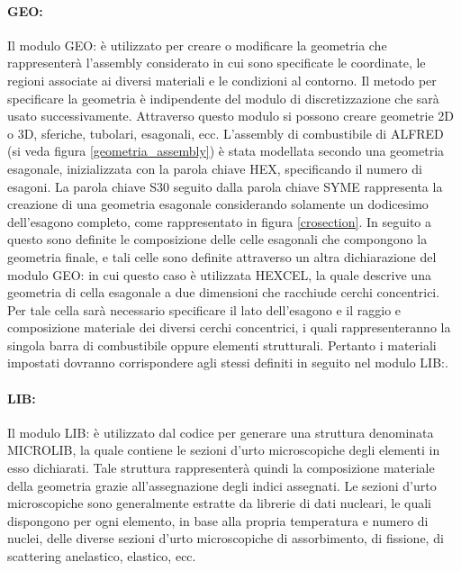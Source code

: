 \paragraph{GEO:}

Il modulo GEO: è utilizzato per creare o modificare la geometria che 
rappresenterà l'assembly considerato in cui sono specificate le coordinate, le 
regioni associate ai diversi materiali e le condizioni al contorno.
Il metodo per specificare la geometria è indipendente del modulo di 
discretizzazione che sarà usato successivamente.
Attraverso questo modulo si possono creare geometrie 2D o 3D, sferiche, 
tubolari, esagonali, ecc.
L'assembly di combustibile di ALFRED (si veda figura \ref{geometria_assembly}) 
è 
stata modellata secondo una geometria esagonale, inizializzata con la parola 
chiave HEX, specificando il numero di esagoni.
La parola chiave S30 seguito dalla parola chiave SYME rappresenta la creazione 
di una geometria esagonale considerando solamente un dodicesimo dell'esagono completo, 
come rappresentato in figura \ref{crosection}.
In seguito a questo sono definite le composizione delle celle esagonali che 
compongono la geometria finale, e tali celle sono definite attraverso un altra 
dichiarazione del modulo GEO: in cui questo caso è utilizzata HEXCEL, la quale descrive 
una geometria di cella esagonale a due dimensioni che racchiude cerchi 
concentrici. Per tale cella sarà necessario specificare il lato dell'esagono e 
il raggio e composizione materiale dei diversi cerchi concentrici, i quali 
rappresenteranno la singola barra di combustibile oppure elementi strutturali.
Pertanto i materiali impostati dovranno corrispondere agli stessi definiti in 
seguito nel modulo LIB:.

\paragraph{LIB:}
Il modulo LIB: è utilizzato dal codice per generare una struttura denominata 
MICROLIB, la quale contiene le sezioni d'urto microscopiche degli elementi in 
esso dichiarati. Tale struttura rappresenterà quindi la composizione materiale 
della geometria grazie all'assegnazione degli indici assegnati.
Le sezioni d'urto microscopiche sono generalmente estratte da librerie di dati 
nucleari, le quali dispongono per ogni elemento, in base alla propria 
temperatura e numero di nuclei, delle diverse sezioni d'urto microscopiche di 
assorbimento, di fissione, di scattering anelastico, elastico, ecc.

